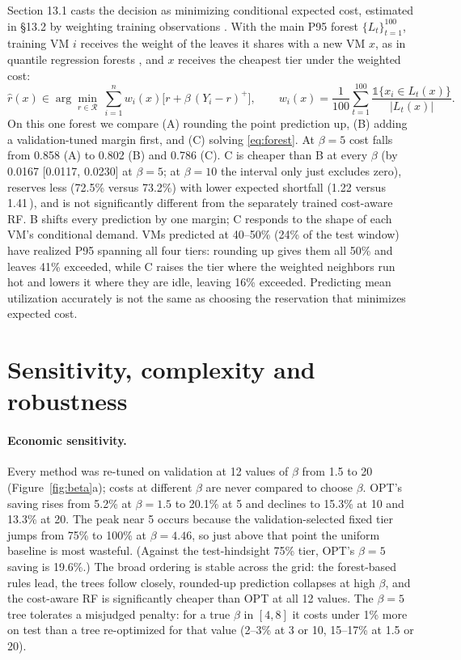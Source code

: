 \documentclass[10pt]{article}
\newcommand{\pp}{\,\text{pp}}
\begin{document}
Section 13.1 casts the decision as minimizing conditional expected cost, estimated in \S13.2 by weighting training observations \citep{bertsimas2020predictive}. With the main P95 forest $\{L_t\}_{t=1}^{100}$, training VM $i$ receives the weight of the leaves it shares with a new VM $x$, as in quantile regression forests \citep{meinshausen2006qrf}, and $x$ receives the cheapest tier under the weighted cost:
\begin{equation}
\hat r(x)\in\arg\min_{r\in\mathcal{R}}\ \sum_{i=1}^{n} w_i(x)\big[r+\beta\,(Y_i-r)^+\big],\qquad
w_i(x)=\frac{1}{100}\sum_{t=1}^{100}\frac{\mathbb{1}\{x_i\in L_t(x)\}}{|L_t(x)|}.
\label{eq:forest}
\end{equation}
On this one forest we compare (A) rounding the point prediction up, (B) adding a validation-tuned margin first, and (C) solving \eqref{eq:forest}. At $\beta=5$ cost falls from 0.858 (A) to 0.802 (B) and 0.786 (C). C is cheaper than B at every $\beta$ (by 0.0167 [0.0117, 0.0230] at $\beta=5$; at $\beta=10$ the interval only just excludes zero), reserves less (72.5\% versus 73.2\%) with lower expected shortfall (1.22 versus 1.41\pp), and is not significantly different from the separately trained cost-aware RF. B shifts every prediction by one margin; C responds to the shape of each VM's conditional demand. VMs predicted at 40--50\% (24\% of the test window) have realized P95 spanning all four tiers: rounding up gives them all 50\% and leaves 41\% exceeded, while C raises the tier where the weighted neighbors run hot and lowers it where they are idle, leaving 16\% exceeded. Predicting mean utilization accurately is not the same as choosing the reservation that minimizes expected cost.

\section{Sensitivity, complexity and robustness}
\label{sec:robust}


\paragraph{Economic sensitivity.} Every method was re-tuned on validation at 12 values of $\beta$ from 1.5 to 20 (Figure~\ref{fig:beta}a); costs at different $\beta$ are never compared to choose $\beta$. OPT's saving rises from 5.2\% at $\beta=1.5$ to 20.1\% at 5 and declines to 15.3\% at 10 and 13.3\% at 20. The peak near 5 occurs because the validation-selected fixed tier jumps from 75\% to 100\% at $\beta=4.46$, so just above that point the uniform baseline is most wasteful. (Against the test-hindsight 75\% tier, OPT's $\beta=5$ saving is 19.6\%.) The broad ordering is stable across the grid: the forest-based rules lead, the trees follow closely, rounded-up prediction collapses at high $\beta$, and the cost-aware RF is significantly cheaper than OPT at all 12 values. The $\beta=5$ tree tolerates a misjudged penalty: for a true $\beta$ in $[4,8]$ it costs under 1\% more on test than a tree re-optimized for that value (2--3\% at 3 or 10, 15--17\% at 1.5 or 20).
\end{document}
